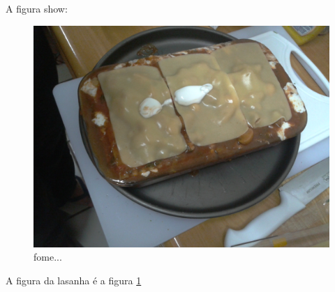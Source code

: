 \documentclass{report}
\begin{document}
A figura show:

\begin{figure}[H]
	\centering
	\includegraphics[width = \textwidth]{./figuraA.jpg}
	\caption{fome...}
	\label{fig:lasanha}
\end{figure}

A figura da lasanha é a figura \ref{fig:lasanha}
\end{document}
